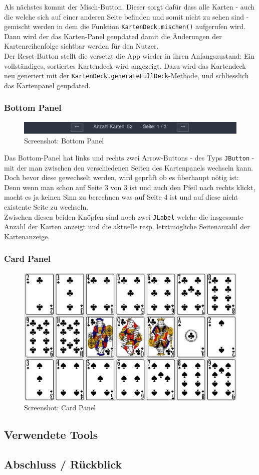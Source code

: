 \documentclass[a4paper,11pt]{article}
\begin{document}
Als nächstes kommt der Misch-Button. Dieser sorgt dafür dass alle Karten - auch die welche sich auf einer anderen Seite befinden und somit nicht zu sehen sind - gemischt werden in dem die Funktion \texttt{KartenDeck.mischen()} aufgerufen wird. Dann wird der das Karten-Panel geupdated damit die Änderungen der Kartenreihenfolge sichtbar werden für den Nutzer.\\

Der Reset-Button stellt die versetzt die App wieder in ihren Anfangszustand: Ein vollständiges, sortiertes Kartendeck wird angezeigt. Dazu wird das Kartendeck neu generiert mit der \texttt{KartenDeck.generateFullDeck}-Methode, und schliesslich das Kartenpanel geupdated.

\subsubsection{Bottom Panel}
\begin{figure}[H]
    \centering
    \includegraphics[width=.9\textwidth]{media/bottom-panel.jpg}
    \caption{Screenshot: Bottom Panel}
\end{figure}

Das Bottom-Panel hat links und rechts zwei Arrow-Buttons - des Typs \texttt{JButton} - mit der man zwischen den verschiedenen Seiten des Kartenpanels wechseln kann. Doch bevor diese gewechselt werden, wird geprüft ob es überhaupt nötig ist: Denn wenn man schon auf Seite 3 von 3 ist und auch den Pfeil nach rechts klickt, macht es ja keinen Sinn zu berechnen was auf Seite 4 ist und auf diese nicht existente Seite zu wechseln.\\

Zwischen diesen beiden Knöpfen sind noch zwei \texttt{JLabel} welche die insgesamte Anzahl der Karten anzeigt und die aktuelle resp. letztmögliche Seitenanzahl der Kartenanzeige.

\subsubsection{Card Panel}
\begin{figure}[H]
    \centering
    \includegraphics[width=.9\textwidth]{media/card-panel.jpg}
    \caption{Screenshot: Card Panel}
\end{figure}

\subsection{Verwendete Tools}

\subsection{Abschluss / Rückblick}
\end{document}
